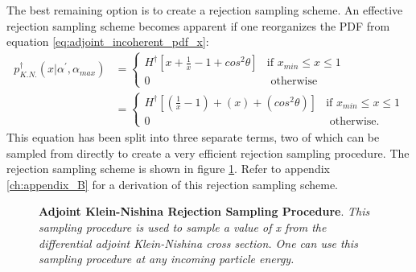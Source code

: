 The best remaining option is to create a rejection sampling scheme. An 
effective rejection sampling scheme becomes apparent if one reorganizes the
PDF from equation \ref{eq:adjoint_incoherent_pdf_x}:
\begin{align}
  p_{K.N.}^{\dagger}(x|\alpha^{'},\alpha_{max}) & = 
  \begin{cases}
    H^{\dagger}\left[x + \frac{1}{x} - 1 + cos^2\theta \right] 
    & \text{if } x_{min} \leq x \leq 1 \\
    0 & \text{ otherwise}
  \end{cases} \nonumber \\
  & = 
  \begin{cases}
    H^{\dagger}\left[\left(\frac{1}{x} - 1 \right) + \left(x\right) + 
      \left(cos^2\theta\right) \right] 
    & \text{if } x_{min} \leq x \leq 1 \\
    0 & \text{ otherwise}.
  \end{cases} \label{eq:reorganized_adjoint_KN_pdf}
\end{align}
This equation has been split into three separate terms, two of which can be 
sampled from directly to create a very efficient rejection sampling procedure.
The rejection sampling scheme is shown in figure 
\ref{fig:adjoint_KN_rejection_sampling}. Refer to appendix \ref{ch:appendix_B}
for a derivation of this rejection sampling scheme.
\begin{figure}[t!]
  \begin{center}
    \def\svgwidth{360bp}
    
  \end{center}
  \caption{\textbf{Adjoint Klein-Nishina Rejection Sampling Procedure}.
    \textit{This sampling procedure is used to sample a value of x from the
    differential adjoint Klein-Nishina cross section. One can use this sampling
    procedure at any incoming particle energy.}}
  \label{fig:adjoint_KN_rejection_sampling}
\end{figure}

